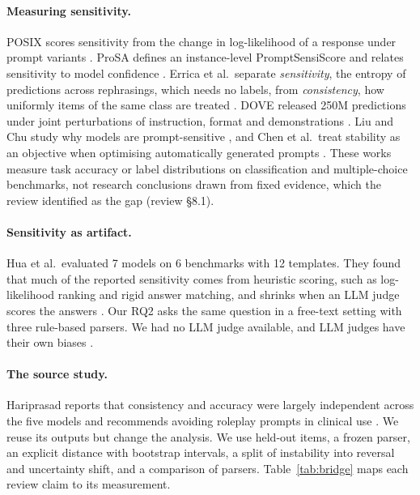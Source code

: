 \documentclass[acmsmall]{acmart}
\begin{document}
\paragraph{Measuring sensitivity.} POSIX scores sensitivity from the change in log-likelihood of a response under prompt variants \cite{chatterjee2024posix}. ProSA defines an instance-level PromptSensiScore and relates sensitivity to model confidence \cite{zhuo2024prosa}. Errica et al.\ separate \emph{sensitivity}, the entropy of predictions across rephrasings, which needs no labels, from \emph{consistency}, how uniformly items of the same class are treated \cite{errica2025sensitivity}. DOVE released 250M predictions under joint perturbations of instruction, format and demonstrations \cite{habba2025dove}. Liu and Chu study why models are prompt-sensitive \cite{liu2026understanding}, and Chen et al.\ treat stability as an objective when optimising automatically generated prompts \cite{chen2026stability}. These works measure task accuracy or label distributions on classification and multiple-choice benchmarks, not research conclusions drawn from fixed evidence, which the review identified as the gap (review \S8.1).

\paragraph{Sensitivity as artifact.} Hua et al.\ evaluated 7 models on 6 benchmarks with 12 templates. They found that much of the reported sensitivity comes from heuristic scoring, such as log-likelihood ranking and rigid answer matching, and shrinks when an LLM judge scores the answers \cite{hua2025flaw}. Our RQ2 asks the same question in a free-text setting with three rule-based parsers. We had no LLM judge available, and LLM judges have their own biases \cite{zheng2023judge}.

\paragraph{The source study.} Hariprasad reports that consistency and accuracy were largely independent across the five models and recommends avoiding roleplay prompts in clinical use \cite{hariprasad2026clinical}. We reuse its outputs but change the analysis. We use held-out items, a frozen parser, an explicit distance with bootstrap intervals, a split of instability into reversal and uncertainty shift, and a comparison of parsers. Table~\ref{tab:bridge} maps each review claim to its measurement.
\end{document}
